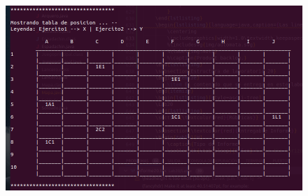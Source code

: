 \documentclass{article}
\begin{document}
	\begin{figure}[H]
		\centering
		\includegraphics[width=1.0\textwidth,keepaspectratio]{img/Commit6.png}
	\end{figure}
\end{document}

